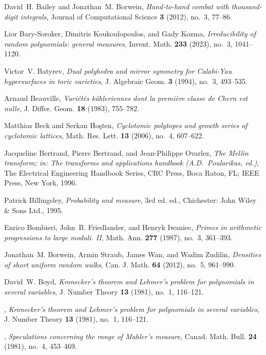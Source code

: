 \documentclass[12pt,reqno]{amsart}
\theoremstyle{definition}
\theoremstyle{plain}
\theoremstyle{definition}
\begin{document}
\begin{thebibliography}{100}
David~H. Bailey and Jonathan~M. Borwein, \emph{Hand-to-hand combat with
  thousand-digit integrals}, Journal of Computational Science \textbf{3}
  (2012), no.~3, 77--86.

Lior Bary-Soroker, Dimitris Koukoulopoulos, and Gady Kozma,
  \emph{Irreducibility of random polynomials: general measures}, Invent. Math.
  \textbf{233} (2023), no.~3, 1041--1120.

Victor~V. Batyrev, \emph{Dual polyhedra and mirror symmetry for {C}alabi-{Y}au
  hypersurfaces in toric varieties}, J. Algebraic Geom. \textbf{3} (1994),
  no.~3, 493--535.

Arnaud Beauville, \emph{Vari{\'e}t{\'e}s k{\"a}hleriennes dont la premi{\`e}re
  classe de {Chern} est nulle}, J. Differ. Geom. \textbf{18} (1983), 755--782.

Matthias Beck and Serkan Ho\c{s}ten, \emph{Cyclotomic polytopes and growth
  series of cyclotomic lattices}, Math. Res. Lett. \textbf{13} (2006), no.~4,
  607--622.

Jacqueline Bertrand, Pierre Bertrand, and Jean-Philippe Ovarlez, \emph{The
  {M}ellin transform; \textup{in: The transforms and applications handbook
  (A.D.~Poularikas, ed.)}}, The Electrical Engineering Handbook Series, CRC
  Press, Boca Raton, FL; IEEE Press, New York, 1996.

Patrick Billingsley, \emph{Probability and measure}, 3rd ed. ed., Chichester:
  John Wiley \& Sons Ltd., 1995.

Enrico Bombieri, John~B. Friedlander, and Henryk Iwaniec, \emph{Primes in
  arithmetic progressions to large moduli. {II}}, Math. Ann. \textbf{277}
  (1987), no.~3, 361--393.

Jonathan~M. Borwein, Armin Straub, James Wan, and Wadim Zudilin,
  \emph{Densities of short uniform random walks}, Can. J. Math. \textbf{64}
  (2012), no.~5, 961--990.

David~W. Boyd, \emph{Kronecker's theorem and {L}ehmer's problem for polynomials
  in several variables}, J. Number Theory \textbf{13} (1981), no.~1, 116--121.

\bysame, \emph{Kronecker's theorem and {L}ehmer's problem for polynomials in
  several variables}, J. Number Theory \textbf{13} (1981), no.~1, 116--121.

\bysame, \emph{Speculations concerning the range of {M}ahler's measure}, Canad.
  Math. Bull. \textbf{24} (1981), no.~4, 453--469.


\end{thebibliography}
\end{document}
